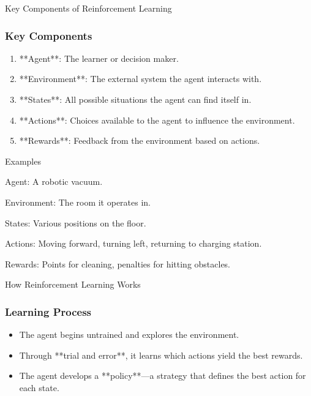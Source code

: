 \documentclass[aspectratio=169]{beamer}
\begin{document}
\begin{frame}[fragile]{Key Components of Reinforcement Learning}
    \frametitle{Key Components}
    \begin{enumerate}
        \item **Agent**: The learner or decision maker.
        \item **Environment**: The external system the agent interacts with.
        \item **States**: All possible situations the agent can find itself in.
        \item **Actions**: Choices available to the agent to influence the environment.
        \item **Rewards**: Feedback from the environment based on actions.
    \end{enumerate}
    
    \begin{block}{Examples}
        \item Agent: A robotic vacuum.
        \item Environment: The room it operates in.
        \item States: Various positions on the floor.
        \item Actions: Moving forward, turning left, returning to charging station.
        \item Rewards: Points for cleaning, penalties for hitting obstacles.
    \end{block}
\end{frame}

\begin{frame}[fragile]{How Reinforcement Learning Works}
    \frametitle{Learning Process}
    \begin{itemize}
        \item The agent begins untrained and explores the environment.
        \item Through **trial and error**, it learns which actions yield the best rewards.
        \item The agent develops a **policy**—a strategy that defines the best action for each state.
    \end{itemize}
\end{frame}
\end{document}
